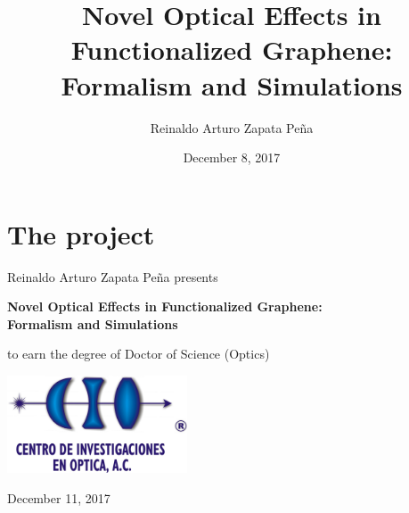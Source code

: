 \documentclass{beamer}
\title[Novel Optical Effects in Functionalized Graphene: 
Formalism and Simulations]
{Novel Optical Effects in Functionalized Graphene: 
Formalism and Simulations}
\author{Reinaldo Arturo Zapata Pe\~na}
\institute{Centro de Investigaciones en \'Optica, A.C.}
\date{December 8, 2017}
\begin{document}
\section*{The project}


\begin{frame}

{\large \rmfamily Reinaldo Arturo Zapata Pe\~na presents}

\begin{center}

{\large \rmfamily \textbf{Novel Optical Effects in Functionalized Graphene: \\ 
Formalism and Simulations}}

\end{center}

{\rmfamily to earn the degree of Doctor of Science (Optics)}


\begin{center}
\includegraphics[width=0.4\textwidth]{figs/logoCIO.jpeg}

\vspace{2mm}
{\rmfamily \small December 11, 2017}
\end{center}

\end{frame}









\end{document}
